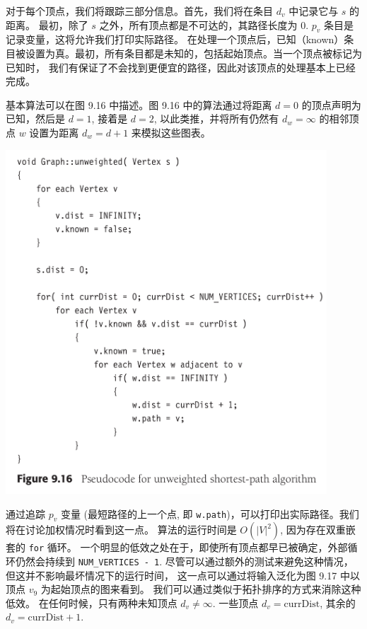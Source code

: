 \documentclass[a4paper]{ctexart}
\theoremstyle{definition}
\theoremstyle{definition}
\begin{document}
对于每个顶点，我们将跟踪三部分信息。首先，我们将在条目 \(d_v\) 中记录它与 \(s\) 的距离。
最初，除了 \(s\) 之外，所有顶点都是不可达的，其路径长度为 $0$. \(p_v\) 条目是记录变量，这将允许我们打印实际路径。
在处理一个顶点后，已知（known）条目被设置为真。最初，所有条目都是未知的，包括起始顶点。当一个顶点被标记为已知时，
我们有保证了不会找到更便宜的路径，因此对该顶点的处理基本上已经完成。

基本算法可以在图 9.16 中描述。图 9.16 中的算法通过将距离 \(d=0\) 的顶点声明为已知，然后是 \(d=1\), 接着是 \(d=2\), 
以此类推，并将所有仍然有 \(d_w=\infty\) 的相邻顶点 \(w\) 设置为距离 \(d_w=d+1\) 来模拟这些图表。

\begin{center}
  \includegraphics[width=0.9\textwidth]{images/FIG9_16.png}
\end{center}

通过追踪 $p_v$ 变量 (最短路径的上一个点, 即 \verb|w.path|)，可以打印出实际路径。我们将在讨论加权情况时看到这一点。
算法的运行时间是 $O(|V|^2)$, 因为存在双重嵌套的 \verb|for| 循环。
一个明显的低效之处在于，即使所有顶点都早已被确定，外部循环仍然会持续到 \verb|NUM_VERTICES - 1|.
尽管可以通过额外的测试来避免这种情况，但这并不影响最坏情况下的运行时间，
这一点可以通过将输入泛化为图 9.17 中以顶点 $v_9$ 为起始顶点的图来看到。
我们可以通过类似于拓扑排序的方式来消除这种低效。
在任何时候，只有两种未知顶点 $d_v \neq \infty$. 一些顶点 $d_v = \mathrm{currDist}$, 
其余的 $d_v = \mathrm{currDist} + 1$. 
\end{document}
